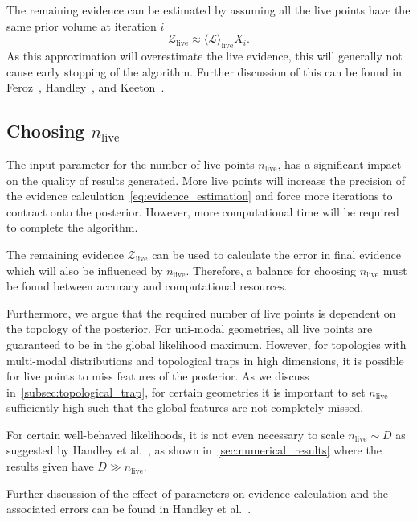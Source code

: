 \documentclass[11pt]{article}
\begin{document}
    The remaining evidence can be estimated by assuming all the live points have the same prior volume at iteration $i$
    \begin{equation}\label{eq:remaining_evidence}
    \mathcal{Z}_{\text{live}} \approx \langle \mathcal{L} \rangle_{\text{live}} X_i.
    \end{equation}
    As this approximation will overestimate the live evidence, this will generally not cause early stopping of the algorithm.
    Further discussion of this can be found in Feroz~\cite{Feroz_2009}, Handley~\cite{Handley_2015}, and
    Keeton~\cite{keeton2011statistical}.

    \subsection{Choosing $n_{\text{live}}$}\label{subsec:ns_termination}
    The input parameter for the number of live points $n_{\text{live}}$, has a significant impact on the quality of results generated.
    More live points will increase the precision of the evidence calculation~\eqref{eq:evidence_estimation} and force more
    iterations to contract onto the posterior.
    However, more computational time will be required to complete the algorithm.

    The remaining evidence $\mathcal{Z}_{\text{live}}$ can be used to calculate the error in final
    evidence~\cite{keeton2011statistical, Handley_2015} which will also be influenced by $n_{\text{live}}$.
    Therefore, a balance for choosing $n_{\text{live}}$ must be found between accuracy and computational resources.

    Furthermore, we argue that the required number of live points is dependent on the topology of the posterior.
    For uni-modal geometries, all live points are guaranteed to be in the global likelihood maximum.
    However, for topologies with multi-modal distributions and topological traps in high dimensions,
    it is possible for live points to miss features of the posterior.
    As we discuss in~\cref{subsec:topological_trap}, for certain geometries it is important to
    set $n_{\text{live}}$ sufficiently high such that the global features are not completely missed.

    For certain well-behaved likelihoods, it is not even necessary to scale $n_{\text{live}} \sim D$ as suggested by
    Handley et al.~\cite{Handley_2015}, as shown in~\cref{sec:numerical_results} where the results given
    have $D \gg n_{\text{live}}$.

    Further discussion of the effect of parameters on evidence calculation and the associated errors can be found in
    Handley et al.~\cite{Handley_2015, NS_Review_2022}.
\end{document}
